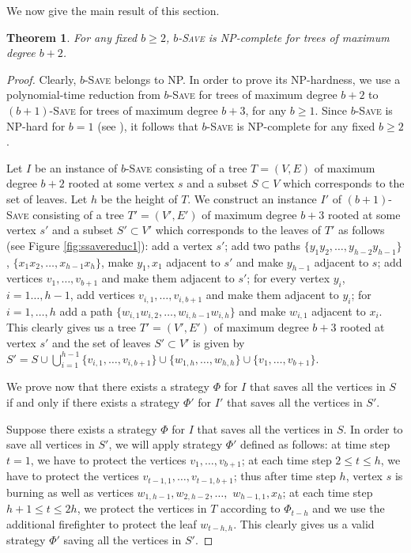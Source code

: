 \documentclass[10pt]{article}
\newtheorem{theorem}{Theorem}
\begin{document}
\noindent
We now give the main result of this section.

\begin{theorem}
\label{th:npc}
For any fixed $b \geq 2$, \textsc{$b$-Save} is NP-complete for
trees of maximum degree $b+2$.
\end{theorem}

\begin{proof}
Clearly, \textsc{$b$-Save} belongs to NP. In order to prove its NP-hardness,
we use a polynomial-time reduction from \textsc{$b$-Save}
for trees of maximum degree $b+2$ to \textsc{$(b+1)$-Save} for
trees of maximum degree $b+3$, for any $b\geq 1$. Since \textsc{$b$-Save} is NP-hard for $b=1$ (see \cite{king2010}), it follows that \textsc{$b$-Save} is NP-complete for any fixed $b \geq 2$.

Let $I$ be an instance of \textsc{$b$-Save} consisting of a tree
$T=(V,E)$ of maximum degree $b+2$ rooted at some vertex $s$ and a subset $S \subset V$ which corresponds
to the set of leaves. Let $h$ be the height of $T$. We construct an instance $I'$ of
\textsc{$(b+1)$-Save} consisting of a tree $T'=(V', E')$ of maximum degree $b+3$ rooted at some vertex $s'$ and a subset $S' \subset V'$ which corresponds to the leaves of $T'$ as follows (see Figure \ref{fig:ssavereduc1}): add a vertex $s'$; add two paths $\{y_1y_2,\ldots,y_{h-2}y_{h-1}\}$, $\{x_1x_2,\ldots,x_{h-1}x_h\}$, make $y_1,x_1$ adjacent to $s'$ and make $y_{h-1}$ adjacent to $s$; add vertices $v_1,\ldots,v_{b+1}$ and make them adjacent to $s'$; for every vertex $y_i$, $i=1\ldots,h-1$, add vertices $v_{i,1},\ldots,v_{i,b+1}$ and make them adjacent to $y_i$; for $i=1,\ldots,h$ add a path $\{w_{i,1}w_{i,2},\ldots,w_{i,h-1}w_{i,h}\}$ and make $w_{i,1}$ adjacent to $x_i$. This clearly gives us a tree $T'=(V',E')$ of maximum degree $b+3$ rooted at vertex $s'$ and the set of leaves $S'\subset V'$ is given by $S'=S\cup\bigcup_{i=1}^{h-1} \{v_{i,1},\ldots,v_{i,b+1}\}\cup \{w_{1,h},\ldots,w_{h,h}\}\cup\{v_1,\ldots,v_{b+1}\}$.





\medskip
We prove now that there exists a strategy $\Phi$ for $I$ that
saves all the vertices in $S$ if and only if there exists a
strategy $\Phi'$ for $I'$ that saves all the vertices in
$S'$.

\medskip
Suppose there exists a strategy $\Phi$ for $I$ that saves all the
vertices in $S$. In order to save all vertices in $S'$, we will
apply strategy $\Phi'$ defined as follows: at time step
$t=1$, we have to protect the vertices $v_{1},\ldots,v_{b+1}$; at each
time step $2\leq t\leq h$, we have to protect the vertices $v_{t-1,1},\ldots,v_{t-1,b+1}$; thus after time step $h$, vertex $s$ is burning as well as vertices $w_{1,h-1},w_{2,h-2},\ldots,$ $w_{h-1,1},x_h$; at each time step $h+1\leq t\leq 2h$, we protect the vertices in $T$ according to $\Phi_{t-h}$ and we use the additional firefighter to protect the leaf $w_{t-h,h}$. This clearly gives us a valid strategy $\Phi'$
saving all the vertices in $S'$.





\end{proof}
\end{document}

